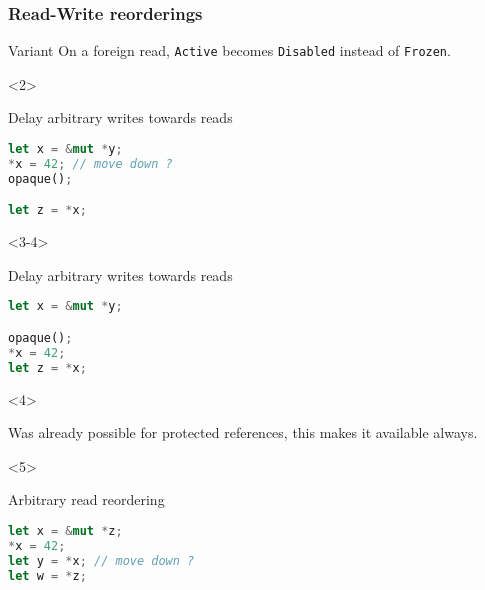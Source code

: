 
\begin{frame}[fragile, t]
    \frametitle{Read-Write reorderings}

    \begin{exampleblock}{Variant}
        On a foreign read, \texttt{Active} becomes \texttt{Disabled} instead of \texttt{Frozen}.
    \end{exampleblock}


    \begin{onlyenv}<2>
        \begin{block}{{\cmark} Delay arbitrary writes towards reads}
            \begin{lstlisting}[language=rust, basicstyle=\ttfamily\scriptsize]
let x = &mut *y;
*x = 42; // move down ?
opaque();

let z = *x;
            \end{lstlisting}
        \end{block}
    \end{onlyenv}

    \begin{onlyenv}<3-4>
        \begin{block}{{\cmark} Delay arbitrary writes towards reads}
            \begin{lstlisting}[language=rust, basicstyle=\ttfamily\scriptsize]
let x = &mut *y;

opaque();
*x = 42;
let z = *x;
            \end{lstlisting}
        \end{block}
    \end{onlyenv}

    \begin{onlyenv}<4>
        \begin{block}{}
            Was already possible for protected references,
            this makes it available always.
        \end{block}
    \end{onlyenv}


    \begin{onlyenv}<5>
        \begin{block}{{\xmark} Arbitrary read reordering}
            \begin{lstlisting}[language=rust]
let x = &mut *z;
*x = 42;
let y = *x; // move down ?
let w = *z;


\end{lstlisting}
\end{block}
\end{onlyenv}
\end{frame}
